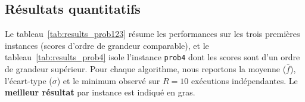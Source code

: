 \subsection{Résultats quantitatifs}

Le tableau~\ref{tab:results_prob123} résume les performances sur les trois
premières instances (scores d'ordre de grandeur comparable), et le
tableau~\ref{tab:results_prob4} isole l'instance \texttt{prob4} dont les scores
sont d'un ordre de grandeur supérieur.  Pour chaque algorithme, nous reportons
la moyenne ($\bar{f}$), l'écart-type ($\sigma$) et le minimum observé sur
$R = 10$ exécutions indépendantes.  Le \textbf{meilleur résultat} par instance
est indiqué en gras.

\begin{table}[H]
\centering
\caption{Résultats sur \texttt{prob1}--\texttt{prob3} ($\bar{f} \pm \sigma$ et
minimum).  Le résultat aberrant de MultiSegment sur \texttt{prob2}
($22\,539$) est dû à un encodage incompatible avec cette instance et a été
exclu de l'analyse.}
\label{tab:results_prob123}
\end{table}
